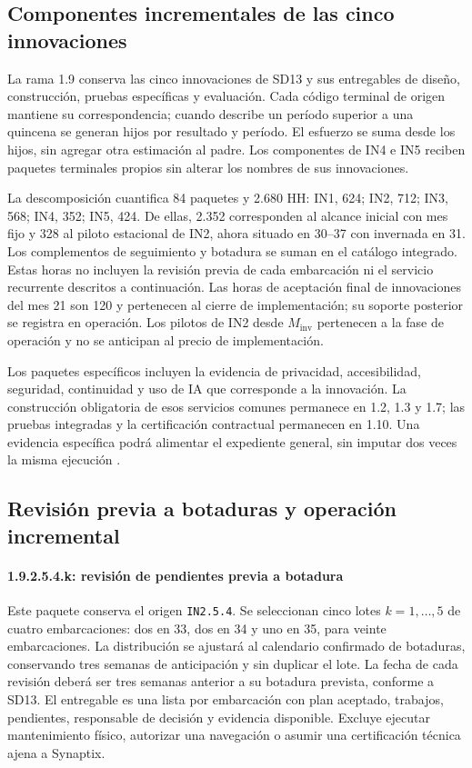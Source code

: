 \subsection{Componentes incrementales de las cinco innovaciones}
La rama 1.9 conserva las cinco innovaciones de SD13 y sus entregables de diseño, construcción, pruebas específicas y evaluación. Cada código terminal de origen mantiene su correspondencia; cuando describe un período superior a una quincena se generan hijos por resultado y período. El esfuerzo se suma desde los hijos, sin agregar otra estimación al padre. Los componentes de IN4 e IN5 reciben paquetes terminales propios sin alterar los nombres de sus innovaciones.

La descomposición cuantifica 84 paquetes y 2.680 HH: IN1, 624; IN2, 712; IN3, 568; IN4, 352; IN5, 424. De ellas, 2.352 corresponden al alcance inicial con mes fijo y 328 al piloto estacional de IN2, ahora situado en 30--37 con invernada en 31. Los complementos de seguimiento y botadura se suman en el catálogo integrado. Estas horas no incluyen la revisión previa de cada embarcación ni el servicio recurrente descritos a continuación. Las horas de aceptación final de innovaciones del mes 21 son 120 y pertenecen al cierre de implementación; su soporte posterior se registra en operación. Los pilotos de IN2 desde $M_{\mathrm{inv}}$ pertenecen a la fase de operación y no se anticipan al precio de implementación.

Los paquetes específicos incluyen la evidencia de privacidad, accesibilidad, seguridad, continuidad y uso de IA que corresponde a la innovación. La construcción obligatoria de esos servicios comunes permanece en 1.2, 1.3 y 1.7; las pruebas integradas y la certificación contractual permanecen en 1.10. Una evidencia específica podrá alimentar el expediente general, sin imputar dos veces la misma ejecución \parencite[caps.~19, 20 y 26]{bases-transversales}.

\subsection{Revisión previa a botaduras y operación incremental}
\paragraph{1.9.2.5.4.k: revisión de pendientes previa a botadura}
Este paquete conserva el origen \texttt{IN2.5.4}. Se seleccionan cinco lotes $k=1,\ldots,5$ de cuatro embarcaciones: dos en 33, dos en 34 y uno en 35, para veinte embarcaciones. La distribución se ajustará al calendario confirmado de botaduras, conservando tres semanas de anticipación y sin duplicar el lote. La fecha de cada revisión deberá ser tres semanas anterior a su botadura prevista, conforme a SD13. El entregable es una lista por embarcación con plan aceptado, trabajos, pendientes, responsable de decisión y evidencia disponible. Excluye ejecutar mantenimiento físico, autorizar una navegación o asumir una certificación técnica ajena a Synaptix.

